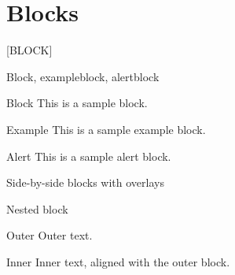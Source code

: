 \documentclass[aspectratio=169]{beamer}
\begin{document}
\section{Blocks}  [BLOCK]
\begin{frame}{Block, exampleblock, alertblock}
    \begin{block}{Block}
        This is a sample block.
    \end{block}

    \begin{exampleblock}{Example}
        This is a sample example block.
    \end{exampleblock}

    \begin{alertblock}{Alert}
        This is a sample alert block.
    \end{alertblock}
\end{frame}

\begin{frame}{Side-by-side blocks with overlays}
    \hfill
\end{frame}

\begin{frame}{Nested block}
    \begin{block}{Outer}
        Outer text.
        \begin{exampleblock}{Inner}
            Inner text, aligned with the outer block.
        \end{exampleblock}
    \end{block}
\end{frame}

\end{document}
